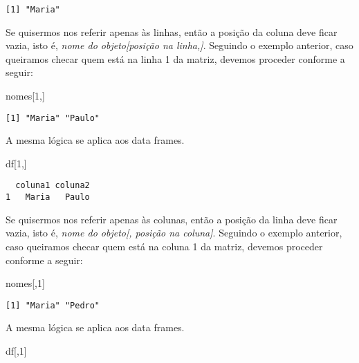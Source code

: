 \documentclass[
  letterpaper,
  DIV=11,
  numbers=noendperiod]{scrreprt}
\newenvironment{Shaded}{\begin{snugshade}}{\end{snugshade}}
\newcommand{\DecValTok}[1]{\textcolor[rgb]{0.68,0.00,0.00}{#1}}
\newcommand{\NormalTok}[1]{\textcolor[rgb]{0.00,0.23,0.31}{#1}}
\begin{document}
\begin{verbatim}
[1] "Maria"
\end{verbatim}

Se quisermos nos referir apenas às linhas, então a posição da coluna
deve ficar vazia, isto é, \emph{nome do objeto{[}posição na linha,{]}}.
Seguindo o exemplo anterior, caso queiramos checar quem está na linha 1
da matriz, devemos proceder conforme a seguir:

\begin{Shaded}
\begin{Highlighting}[]
\NormalTok{nomes[}\DecValTok{1}\NormalTok{,]}
\end{Highlighting}
\end{Shaded}

\begin{verbatim}
[1] "Maria" "Paulo"
\end{verbatim}

A mesma lógica se aplica aos data frames.

\begin{Shaded}
\begin{Highlighting}[]
\NormalTok{df[}\DecValTok{1}\NormalTok{,]}
\end{Highlighting}
\end{Shaded}

\begin{verbatim}
  coluna1 coluna2
1   Maria   Paulo
\end{verbatim}

Se quisermos nos referir apenas às colunas, então a posição da linha
deve ficar vazia, isto é, \emph{nome do objeto{[}, posição na
coluna{]}}. Seguindo o exemplo anterior, caso queiramos checar quem está
na coluna 1 da matriz, devemos proceder conforme a seguir:

\begin{Shaded}
\begin{Highlighting}[]
\NormalTok{nomes[,}\DecValTok{1}\NormalTok{]}
\end{Highlighting}
\end{Shaded}

\begin{verbatim}
[1] "Maria" "Pedro"
\end{verbatim}

A mesma lógica se aplica aos data frames.

\begin{Shaded}
\begin{Highlighting}[]
\NormalTok{df[,}\DecValTok{1}\NormalTok{]}
\end{Highlighting}
\end{Shaded}
\end{document}
